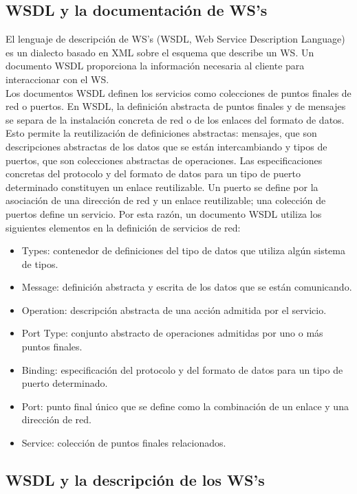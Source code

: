 \subsection{WSDL y la documentación de WS's}

El lenguaje de descripción de WS's (WSDL, Web Service Description Language) es un dialecto basado en XML sobre el esquema que describe un WS. Un documento WSDL proporciona la información necesaria al cliente para interaccionar con el WS. \\
Los documentos WSDL definen los servicios como colecciones de puntos finales de red o puertos. En WSDL, la definición abstracta de puntos finales y de mensajes se separa de la instalación concreta de red o de los enlaces del formato de datos. Esto permite la reutilización de definiciones abstractas: mensajes, que son descripciones abstractas de los datos que se están intercambiando y tipos de puertos, que son colecciones abstractas de operaciones. Las especificaciones concretas del protocolo y del formato de datos para un tipo de puerto determinado constituyen un enlace reutilizable. Un puerto se define por la asociación de una dirección de red y un enlace reutilizable; una colección de puertos define un servicio. Por esta razón, un documento WSDL utiliza los siguientes elementos en la definición de servicios de red: 

\begin{itemize}
	\item Types: contenedor de definiciones del tipo de datos que utiliza algún sistema de tipos.
	\item Message: definición abstracta y escrita de los datos que se están comunicando.
	\item Operation: descripción abstracta de una acción admitida por el servicio.
	\item Port Type: conjunto abstracto de operaciones admitidas por uno o más puntos finales.
	\item Binding: especificación del protocolo y del formato de datos para un tipo de puerto determinado.
	\item Port: punto final único que se define como la combinación de un enlace y una dirección de red.
	\item Service: colección de puntos finales relacionados.
\end{itemize}

\subsection{WSDL y la descripción de los WS's}

